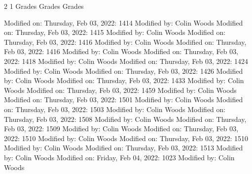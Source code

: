 2
1
Grades Grades
Grades

Modified on: Thursday, Feb 03, 2022: 1414
Modified by: Colin Woods
Modified on: Thursday, Feb 03, 2022: 1415
Modified by: Colin Woods
Modified on: Thursday, Feb 03, 2022: 1416
Modified by: Colin Woods
Modified on: Thursday, Feb 03, 2022: 1416
Modified by: Colin Woods
Modified on: Thursday, Feb 03, 2022: 1418
Modified by: Colin Woods
Modified on: Thursday, Feb 03, 2022: 1424
Modified by: Colin Woods
Modified on: Thursday, Feb 03, 2022: 1426
Modified by: Colin Woods
Modified on: Thursday, Feb 03, 2022: 1433
Modified by: Colin Woods
Modified on: Thursday, Feb 03, 2022: 1459
Modified by: Colin Woods
Modified on: Thursday, Feb 03, 2022: 1501
Modified by: Colin Woods
Modified on: Thursday, Feb 03, 2022: 1503
Modified by: Colin Woods
Modified on: Thursday, Feb 03, 2022: 1508
Modified by: Colin Woods
Modified on: Thursday, Feb 03, 2022: 1509
Modified by: Colin Woods
Modified on: Thursday, Feb 03, 2022: 1510
Modified by: Colin Woods
Modified on: Thursday, Feb 03, 2022: 1510
Modified by: Colin Woods
Modified on: Thursday, Feb 03, 2022: 1513
Modified by: Colin Woods
Modified on: Friday, Feb 04, 2022: 1023
Modified by: Colin Woods

